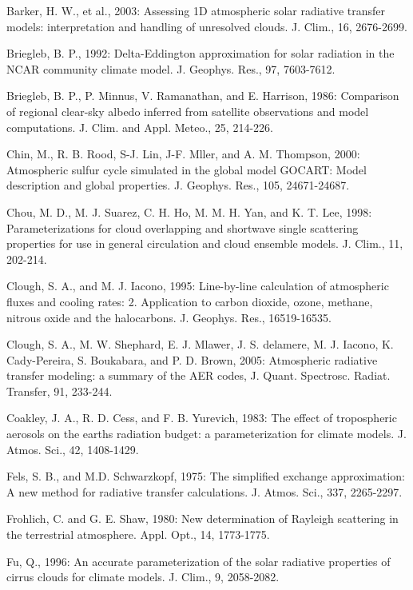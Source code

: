 Barker, H. W., et al., 2003\+: Assessing 1D atmospheric solar radiative transfer models\+: interpretation and handling of unresolved clouds. J. Clim., 16, 2676-\/2699.

Briegleb, B. P., 1992\+: Delta-\/\+Eddington approximation for solar radiation in the N\+C\+AR community climate model. J. Geophys. Res., 97, 7603-\/7612.

Briegleb, B. P., P. Minnus, V. Ramanathan, and E. Harrison, 1986\+: Comparison of regional clear-\/sky albedo inferred from satellite observations and model computations. J. Clim. and Appl. Meteo., 25, 214-\/226.

Chin, M., R. B. Rood, S-\/J. Lin, J-\/F. Mller, and A. M. Thompson, 2000\+: Atmospheric sulfur cycle simulated in the global model G\+O\+C\+A\+RT\+: Model description and global properties. J. Geophys. Res., 105, 24671-\/24687.

Chou, M. D., M. J. Suarez, C. H. Ho, M. M. H. Yan, and K. T. Lee, 1998\+: Parameterizations for cloud overlapping and shortwave single scattering properties for use in general circulation and cloud ensemble models. J. Clim., 11, 202-\/214.

Clough, S. A., and M. J. Iacono, 1995\+: Line-\/by-\/line calculation of atmospheric fluxes and cooling rates\+: 2. Application to carbon dioxide, ozone, methane, nitrous oxide and the halocarbons. J. Geophys. Res., 16519-\/16535.

Clough, S. A., M. W. Shephard, E. J. Mlawer, J. S. delamere, M. J. Iacono, K. Cady-\/\+Pereira, S. Boukabara, and P. D. Brown, 2005\+: Atmospheric radiative transfer modeling\+: a summary of the A\+ER codes, J. Quant. Spectrosc. Radiat. Transfer, 91, 233-\/244.

Coakley, J. A., R. D. Cess, and F. B. Yurevich, 1983\+: The effect of tropospheric aerosols on the earth\textquotesingle{}s radiation budget\+: a parameterization for climate models. J. Atmos. Sci., 42, 1408-\/1429.

Fels, S. B., and M.\+D. Schwarzkopf, 1975\+: The simplified exchange approximation\+: A new method for radiative transfer calculations. J. Atmos. Sci., 337, 2265-\/2297.

Frohlich, C. and G. E. Shaw, 1980\+: New determination of Rayleigh scattering in the terrestrial atmosphere. Appl. Opt., 14, 1773-\/1775.

Fu, Q., 1996\+: An accurate parameterization of the solar radiative properties of cirrus clouds for climate models. J. Clim., 9, 2058-\/2082.

